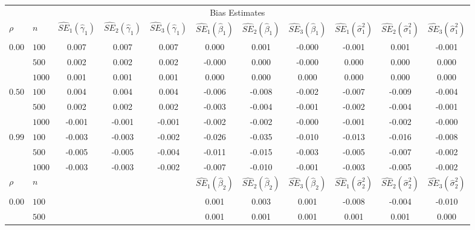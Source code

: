 \begin{landscape}
\begin{table}[ht]
\begin{center}
\begin{tabular}{llccccccccc}
   \hline \multicolumn{11}{c}{Bias Estimates}\\ $\rho$ & $n$ & $\widehat{SE}_1(\widehat{\gamma}_1)$ & $\widehat{SE}_2(\widehat{\gamma}_1)$ & $\widehat{SE}_3(\widehat{\gamma}_1)$ & $\widehat{SE}_1(\widehat{\beta}_1)$ & $\widehat{SE}_2(\widehat{\beta}_1)$ & $\widehat{SE}_3(\widehat{\beta}_1)$ & $\widehat{SE}_1(\widehat{\sigma}^2_1)$ & $\widehat{SE}_2(\widehat{\sigma}^2_1)$ & $\widehat{SE}_3(\widehat{\sigma}^2_1)$ \\ 
   \hline$0.00$ & $100$ & 0.007 & 0.007 & 0.007 & 0.000 & 0.001 & -0.000 & -0.001 & 0.001 & -0.001 \\ 
    & $500$ & 0.002 & 0.002 & 0.002 & -0.000 & 0.000 & -0.000 & 0.000 & 0.000 & 0.000 \\ 
    & $1000$ & 0.001 & 0.001 & 0.001 & 0.000 & 0.000 & 0.000 & 0.000 & 0.000 & 0.000 \\ 
  $0.50$ & $100$ & 0.004 & 0.004 & 0.004 & -0.006 & -0.008 & -0.002 & -0.007 & -0.009 & -0.004 \\ 
    & $500$ & 0.002 & 0.002 & 0.002 & -0.003 & -0.004 & -0.001 & -0.002 & -0.004 & -0.001 \\ 
    & $1000$ & -0.001 & -0.001 & -0.001 & -0.002 & -0.002 & -0.000 & -0.001 & -0.002 & -0.000 \\ 
  $0.99$ & $100$ & -0.003 & -0.003 & -0.002 & -0.026 & -0.035 & -0.010 & -0.013 & -0.016 & -0.008 \\ 
    & $500$ & -0.005 & -0.005 & -0.004 & -0.011 & -0.015 & -0.003 & -0.005 & -0.007 & -0.002 \\ 
    & $1000$ & -0.003 & -0.003 & -0.002 & -0.007 & -0.010 & -0.001 & -0.003 & -0.005 & -0.002 \\ 
   \hline$\rho$ & $n$ &   &   &   & $\widehat{SE}_1(\widehat{\beta}_2)$ & $\widehat{SE}_2(\widehat{\beta}_2)$ & $\widehat{SE}_3(\widehat{\beta}_2)$ & $\widehat{SE}_1(\widehat{\sigma}^2_2)$ & $\widehat{SE}_2(\widehat{\sigma}^2_2)$ & $\widehat{SE}_3(\widehat{\sigma}^2_2)$ \\ 
   \hline$0.00$ & $100$ &   &   &   & 0.001 & 0.003 & 0.001 & -0.008 & -0.004 & -0.010 \\ 
    & $500$ &   &   &   & 0.001 & 0.001 & 0.001 & 0.001 & 0.001 & 0.000 \\ 

\end{tabular}
\end{center}
\end{table}
\end{landscape}
